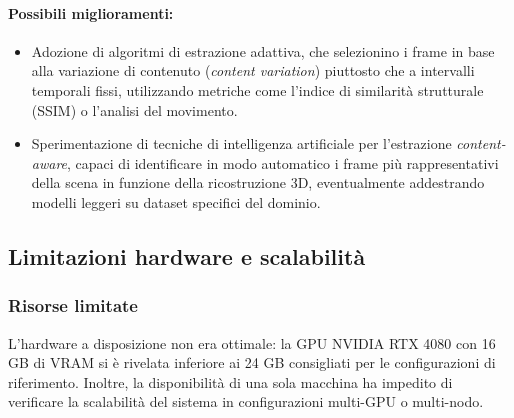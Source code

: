 \paragraph{Possibili miglioramenti:}
\begin{itemize}
	\item Adozione di algoritmi di estrazione adattiva, che selezionino i frame in base alla variazione di contenuto (\emph{content variation}) piuttosto che a intervalli temporali fissi, utilizzando metriche come l'indice di similarità strutturale (SSIM) o l'analisi del movimento.
	\item Sperimentazione di tecniche di intelligenza artificiale per l'estrazione \emph{content-aware}, capaci di identificare in modo automatico i frame più rappresentativi della scena in funzione della ricostruzione 3D, eventualmente addestrando modelli leggeri su dataset specifici del dominio.
\end{itemize}
\newpage
\subsection{Limitazioni hardware e scalabilità}
\subsubsection{Risorse limitate}
L'hardware a disposizione non era ottimale: la GPU NVIDIA RTX 4080 con 16 GB di VRAM si è rivelata inferiore ai 24 GB consigliati per le configurazioni di riferimento.  
Inoltre, la disponibilità di una sola macchina ha impedito di verificare la scalabilità del sistema in configurazioni multi-GPU o multi-nodo.

